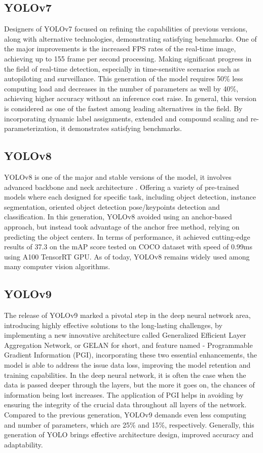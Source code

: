 \begin{multicols}{2}
\subsection{YOLOv7}
Designers of YOLOv7 focused on refining the capabilities of previous versions, along with alternative technologies, demonstrating satisfying benchmarks. One of the major improvements is the increased FPS rates of the real-time image, achieving up to 155 frame per second processing. Making significant progress in the field of real-time detection, especially in time-sensitive scenarios such as autopiloting and surveillance. This generation of the model requires 50\% less computing load and decreases in the number of parameters as well by 40\%, achieving higher accuracy without an inference cost raise. In general, this version is considered as one of the fastest among leading alternatives in the field. By incorporating dynamic label assignments, extended and compound scaling and re-parameterization, it demonstrates satisfying benchmarks.

\subsection{YOLOv8}
YOLOv8 is one of the major and stable versions of the model, it involves advanced backbone and neck architecture \citep{Ultralytics2024}. Offering a variety of pre-trained models where each designed for specific task, including object detection, instance segmentation, oriented object detection pose/keypoints detection and classification. In this generation, YOLOv8 avoided using an anchor-based approach, but instead took advantage of the anchor free method, relying on predicting the object centers. In terms of performance, it achieved cutting-edge results of 37.3 on the mAP score tested on COCO dataset with speed of 0.99ms using A100 TensorRT GPU. As of today, YOLOv8 remains widely used among many computer vision algorithms.

\subsection{YOLOv9}
The release of YOLOv9 marked a pivotal step in the deep neural network area, introducing highly effective solutions to the long-lasting challenges, by implementing a new innovative architecture called Generalized Efficient Layer Aggregation Network, or GELAN for short, and feature named - Programmable Gradient Information (PGI), incorporating these two essential enhancements, the model is able to address the issue data loss, improving the model retention and training capabilities. In the deep neural network, it is often the case when the data is passed deeper through the layers, but the more it goes on, the chances of information being lost increases. The application of PGI helps in avoiding by ensuring the integrity of the crucial data throughout all layers of the network. Compared to the previous generation, YOLOv9 demands even less computing and number of parameters, which are 25\% and 15\%, respectively. Generally, this generation of YOLO brings effective architecture design, improved accuracy and adaptability.


\end{multicols}
